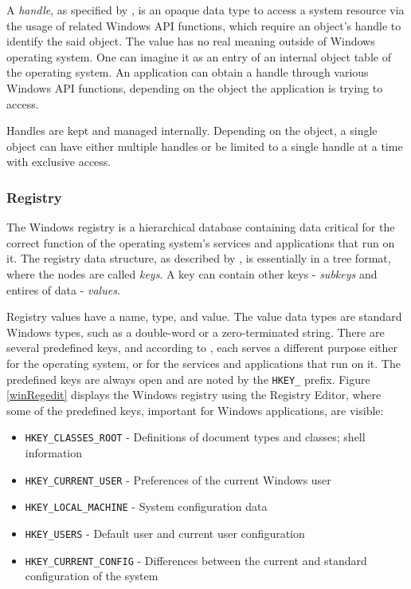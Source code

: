 A \textit{handle}, as specified by \cite{HandlesAndObjects}, is an opaque data type to access a system resource via the usage of related Windows API functions, which require an object's handle to identify the said object. The value has no real meaning outside of Windows operating system. One can imagine it as an entry of an internal object table of the operating system. An application can obtain a handle through various Windows API functions, depending on the object the application is trying to access.

Handles are kept and managed internally. Depending on the object, a single object can have either multiple handles or be limited to a single handle at a time with exclusive access.\cite{WinHandleLimits}

\subsubsection{Registry}
The Windows registry is a hierarchical database containing data critical for the correct function of the operating system's services and applications that run on it. The registry data structure, as described by \cite{WinRegStruct}, is essentially in a tree format, where the nodes are called \textit{keys}. A key can contain other keys - \textit{subkeys} and entires of data - \textit{values}. 

Registry values have a name, type, and value. The value data types are standard Windows types, such as a double-word or a zero-terminated string. There are several predefined keys, and according to \cite{WinRegPreKeys}, each serves a different purpose either for the operating system, or for the services and applications that run on it. The predefined keys are always open and are noted by the \lstinline{HKEY_} prefix. Figure \ref{winRegedit} displays the Windows registry using the Registry Editor, where some of the predefined keys, important for Windows applications, are visible:
\begin{itemize}
    \item \lstinline{HKEY_CLASSES_ROOT} - Definitions of document types and classes; shell information
    \item \lstinline{HKEY_CURRENT_USER} - Preferences of the current Windows user
    \item \lstinline{HKEY_LOCAL_MACHINE} - System configuration data
    \item \lstinline{HKEY_USERS} - Default user and current user configuration
    \item \lstinline{HKEY_CURRENT_CONFIG} - Differences between the current and standard configuration of the system
\end{itemize}

